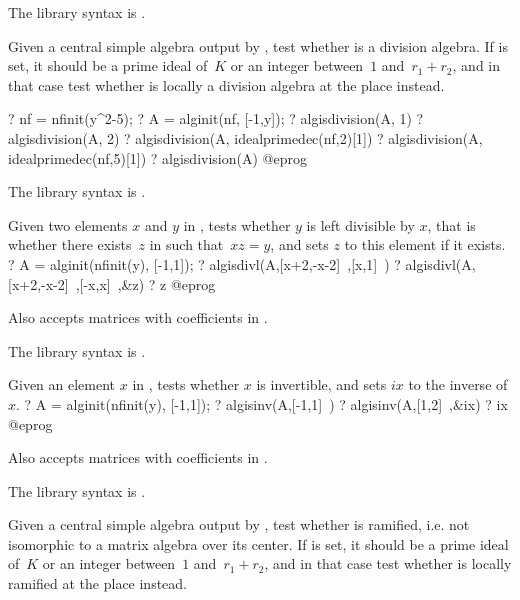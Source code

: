 The library syntax is .

\label{se:algisdivision}
Given a central simple algebra  output by , test
whether  is a division algebra. If  is set, it should be a
prime ideal of~$K$ or an integer between~$1$ and~$r_1+r_2$, and in that case
test whether  is locally a division algebra at the place 
instead.

\bprog
? nf = nfinit(y^2-5);
? A = alginit(nf, [-1,y]);
? algisdivision(A, 1)
? algisdivision(A, 2)
? algisdivision(A, idealprimedec(nf,2)[1])
? algisdivision(A, idealprimedec(nf,5)[1])
? algisdivision(A)
@eprog

The library syntax is .

\label{se:algisdivl}
Given two elements $x$ and $y$ in , tests whether $y$ is left
divisible by $x$, that is whether there exists~$z$ in  such
that~$xz=y$, and sets $z$ to this element if it exists.
\bprog
? A = alginit(nfinit(y), [-1,1]);
? algisdivl(A,[x+2,-x-2]~,[x,1]~)
? algisdivl(A,[x+2,-x-2]~,[-x,x]~,&z)
? z
@eprog

Also accepts matrices with coefficients in .

The library syntax is .

\label{se:algisinv}
Given an element $x$ in , tests whether $x$ is invertible, and sets
$ix$ to the inverse of $x$.
\bprog
? A = alginit(nfinit(y), [-1,1]);
? algisinv(A,[-1,1]~)
? algisinv(A,[1,2]~,&ix)
? ix
@eprog

Also accepts matrices with coefficients in .

The library syntax is .

\label{se:algisramified}
Given a central simple algebra  output by , test
whether  is ramified, i.e. not isomorphic to a matrix algebra over its
center. If  is set, it should be a prime ideal of~$K$ or an integer
between~$1$ and~$r_1+r_2$, and in that case test whether  is locally
ramified at the place  instead.

